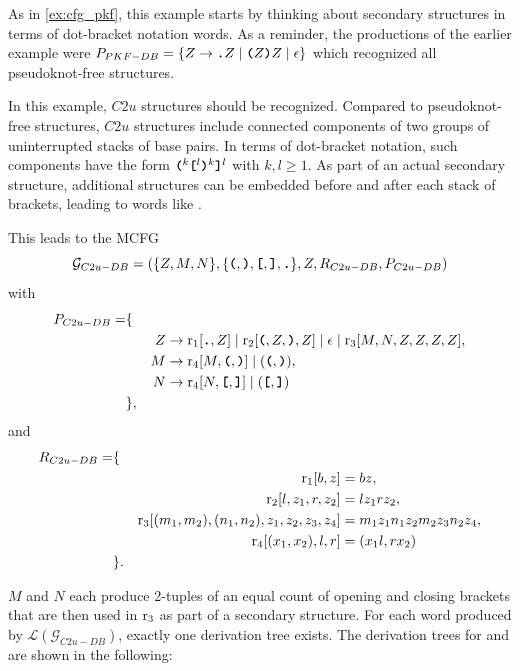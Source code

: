 \documentclass[
    a4paper,
    12pt,
    twoside,
    BCOR=12mm,
    parskip=half,
    chapterprefix,
    numbers=noenddot,
    bibliography=totoc
]{scrbook}
\begin{document}
\begin{example}
	\label{ex:mcfg_c2u}
	As in \cref{ex:cfg_pkf}, this example starts by thinking about secondary structures in terms of dot-bracket notation words. As a reminder, the productions of the earlier example were $P_{PKF-DB} = \{Z \to \ts{.}Z \mid \ts{(}Z\ts{)}Z \mid \epsilon\}$ which recognized all pseudoknot-free structures. 

	In this example, $C2u$ structures should be recognized. Compared to pseudoknot-free structures, $C2u$ structures include connected components of two groups of uninterrupted stacks of base pairs. In terms of dot-bracket notation, such components have the form $\ts{(}^k \ts{[}^l \ts{)}^k \ts{]}^l$ with $k,l \geq 1$. As part of an actual secondary structure, additional structures can be embedded before and after each stack of brackets, leading to words like .
	
	This leads to the \gls{MCFG} 
	\[ \mathcal{G}_{C2u-DB} = (\{Z,M,N\},\{\ts{(},\ts{)},\ts{[},\ts{]},\ts{.}\},Z,R_{C2u-DB},P_{C2u-DB}) \]
	with 
	\begin{align*}
		P_{C2u-DB} = &\{&&\\
		&&Z &\to \op{r}_1[\ts{.},Z] \mid \op{r}_2[\ts{(},Z,\ts{)},Z] \mid \epsilon \mid \op{r}_3[M,N,Z,Z,Z,Z],\\
		&&M &\to \op{r}_4[M,\ts{(},\ts{)}] \mid (\ts{(},\ts{)}),\\
		&&N &\to \op{r}_4[N,\ts{[},\ts{]}] \mid (\ts{[},\ts{]})\\
		&\},&&
	\end{align*}
	and
	\begin{align*}
		R_{C2u-DB} = &\{&&\\
		&&\mathrm{r}_1[b,z] &= bz,\\
		&&\mathrm{r}_2[l,z_1,r,z_2] &= l z_1 r z_2,\\
		&&\mathrm{r}_3[(m_1,m_2),(n_1,n_2),z_1,z_2,z_3,z_4] &= m_1 z_1 n_1 z_2 m_2 z_3 n_2 z_4,\\
		&&\mathrm{r}_4[(x_1,x_2),l,r] &= (x_1 l,r x_2)\\
		&\}.&&
	\end{align*}
		
	$M$ and $N$ each produce 2-tuples of an equal count of opening and closing brackets that are then used in $\mathrm{r}_3$ as part of a secondary structure. For each word produced by $\mathcal{L}(\mathcal{G}_{C2u-DB})$, exactly one derivation tree exists. The derivation trees for  and \ts{([())]} are shown in the following:
	

\end{example}
\end{document}
